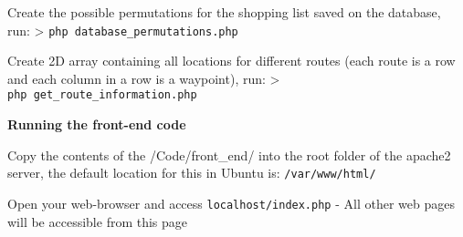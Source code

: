 \documentclass[]{article}
\begin{document}
Create the possible permutations for the shopping list saved on the
database, run: \textgreater{} \texttt{php\ database\_permutations.php}

Create 2D array containing all locations for different routes (each
route is a row and each column in a row is a waypoint), run:
\textgreater{} \texttt{php\ get\_route\_information.php}

\textbf{Running the front-end code}

Copy the contents of the /Code/front\_end/ into the root folder of the
apache2 server, the default location for this in Ubuntu is:
\texttt{/var/www/html/}

Open your web-browser and access \texttt{localhost/index.php} - All
other web pages will be accessible from this page
\end{document}
